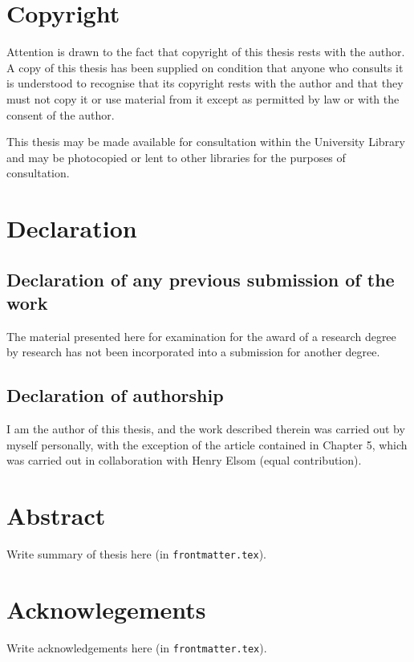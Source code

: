 \newpage


\chapter*{Copyright}

Attention is drawn to the fact that copyright of this thesis rests with the author. 
A copy of this thesis has been supplied on condition that anyone who consults it is 
understood to recognise that its copyright rests with the author and that they must 
not copy it or use material from it except as permitted by law or with the consent of the author.

This thesis may be made available for consultation within the University Library and 
may be photocopied or lent to other libraries for the purposes of consultation. 

\newpage

\chapter*{Declaration}

\section*{Declaration of any previous submission of the work}

The material presented here for examination for the award of a research degree by research 
has not been incorporated into a submission for another degree.

\section*{Declaration of authorship}

I am the author of this thesis, and the work described therein was carried out by myself personally, 
with the exception of the article contained in Chapter 5, which was carried out in collaboration with Henry Elsom (equal contribution). 

\newpage

\chapter*{Abstract}

Write summary of thesis here (in \texttt{frontmatter.tex}).

\newpage

\chapter*{Acknowlegements}

Write acknowledgements here (in \texttt{frontmatter.tex}).

\newpage

\setcounter{page}{5} %

\tableofcontents
\newpage
\listoffigures
\newpage
\listoftables

\newpage
{} %